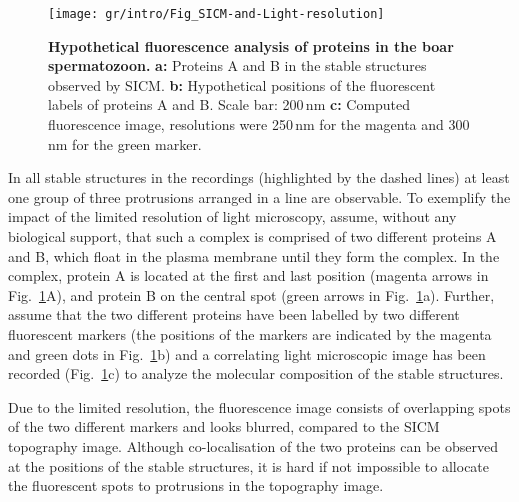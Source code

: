 \begin{figure}
  \sidecaption
  \texttt{[image: gr/intro/Fig\_SICM-and-Light-resolution]}%
  \caption{\textbf{Hypothetical fluorescence analysis of proteins in the boar
      spermatozoon.} \textbf{a:} Proteins A and B in the stable structures
    observed by SICM. \textbf{b:} Hypothetical positions of the fluorescent
    labels of proteins A and B. Scale bar: 200\,nm \textbf{c:} Computed
    fluorescence image, resolutions were 250\,nm for the magenta and 300\,nm
    for the green marker.}
  \label{fig:sicm-and-light-resolution}
\end{figure}
In all stable structures in the recordings (highlighted by the dashed lines)
at least one group of three protrusions arranged in a line are observable. To
exemplify the impact of the limited resolution of light microscopy, assume,
without any biological support, that such a complex is comprised of two
different proteins A and B, which float in the plasma membrane until they form
the complex. In the complex, protein A is located at the first and last
position (magenta arrows in Fig.~\ref{fig:sicm-and-light-resolution}A), and
protein B on the central spot (green arrows in
Fig.~\ref{fig:sicm-and-light-resolution}a). Further, assume that the two
different proteins have been labelled by two different fluorescent markers
(the positions of the markers are indicated by the magenta and green dots in
Fig.~\ref{fig:sicm-and-light-resolution}b) and a correlating light microscopic
image has been recorded (Fig.~\ref{fig:sicm-and-light-resolution}c) to analyze
the molecular composition of the stable structures.

Due to the limited resolution, the fluorescence image consists of overlapping
spots of the two different markers and looks blurred, compared to the
SICM topography image. Although co-localisation of the two proteins can be
observed at the positions of the stable structures, it is hard if not
impossible to allocate the fluorescent spots to protrusions in the topography
image.


